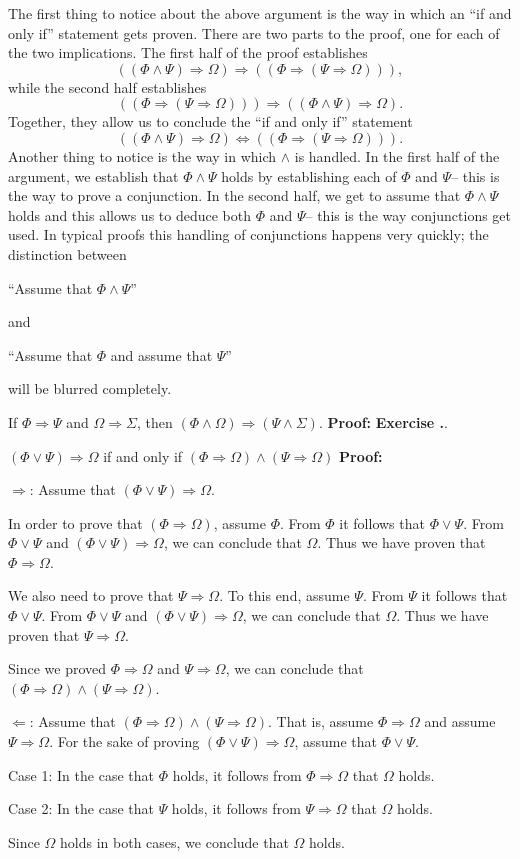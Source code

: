 \documentclass[12pt]{article}
\newcommand{\AND}{\wedge}
\newcommand{\OR}{\vee}
\newcommand{\ARR}{\Rightarrow}
\newcommand{\DARR}{\Leftrightarrow}
\newcounter{exercise}[subsubsection]
\newcounter{rule}
\def\putExerciseHeading{\refstepcounter{exercise} \textbf{Exercise \thesubsubsection.\theexercise}}
\def\putRuleNumber{\refstepcounter{rule}\therule}
\newcommand{\DRULEPF}[3]{\begin{tcolorbox}[title=Derived Rule \putRuleNumber: #1,colbacktitle=white,coltitle=black,colback=white] {#2} \tcblower \textbf{Proof:} {#3} \end{tcolorbox}}
\newcommand{\DRULEPZ}[2]{\begin{tcolorbox}[title=Derived Rule \putRuleNumber: #1,colbacktitle=white,coltitle=black,colback=white] {#2} \tcblower \textbf{Proof:} 
                         \putExerciseHeading. \end{tcolorbox}}
\def\pA{\Phi}
\def\pB{\Psi}
\def\pC{\Omega}
\def\pD{\Sigma}
\begin{document}
The first thing to notice about the above argument is the way in which an ``if and only if'' statement gets proven.
There are two parts to the proof, one for each of the two implications.
The first half of the proof establishes 
$$((\pA\AND\pB)\ARR\pC)\ARR((\pA\ARR(\pB\ARR\pC))),$$
while the second half establishes
$$((\pA\ARR(\pB\ARR\pC)))\ARR((\pA\AND\pB)\ARR\pC).$$
Together, they allow us to conclude the ``if and only if'' statement
$$((\pA\AND\pB)\ARR\pC)\DARR((\pA\ARR(\pB\ARR\pC))).$$
Another thing to notice is the way in which $\AND$ is handled.
In the first half of the argument, we establish that $\pA\AND\pB$ holds by establishing each of $\pA$ and $\pB$-- this is the way to prove a conjunction.
In the second half, we get to assume that $\pA\AND\pB$ holds and this allows us to deduce both $\pA$ and $\pB$-- this is the way conjunctions get used.
In typical proofs this handling of conjunctions happens very quickly; the distinction between
\begin{center} ``Assume that $\pA\AND\pB$''\end{center}
and
\begin{center} ``Assume that $\pA$ and assume that $\pB$''\end{center}
will be blurred completely.

\DRULEPZ{}{If $\pA\ARR\pB$ and $\pC\ARR\pD$, then $(\pA\AND\pC)\ARR(\pB\AND\pD)$.}

\DRULEPF{Disjunction and Implication}{
$(\pA\OR\pB)\ARR\pC$ if and only if $(\pA\ARR\pC)\AND(\pB\ARR\pC)$
}{
$\Rightarrow$:
Assume that $(\pA\OR\pB)\ARR\pC$.
\lsp

In order to prove that $(\pA\ARR\pC)$, assume $\pA$.
From $\pA$ it follows that $\pA\OR\pB$.
From $\pA\OR\pB$ and $(\pA\OR\pB)\ARR\pC$, we can conclude that $\pC$.
Thus we have proven that $\pA\ARR\pC$.
\lsp

We also need to prove that $\pB\ARR\pC$. To this end, assume $\pB$.
From $\pB$ it follows that $\pA\OR\pB$.
From $\pA\OR\pB$ and $(\pA\OR\pB)\ARR\pC$, we can conclude that $\pC$.
Thus we have proven that $\pB\ARR\pC$.
\lsp

Since we proved $\pA\ARR\pC$ and $\pB\ARR\pC$, we can conclude that $(\pA\ARR\pC)\AND(\pB\ARR\pC)$.
\lsp

$\Leftarrow$: 
Assume that $(\pA\ARR\pC)\AND(\pB\ARR\pC)$.
That is, assume  $\pA\ARR\pC$ and assume $\pB\ARR\pC$.
For the sake of proving $(\pA\OR\pB)\ARR\pC$, assume that $\pA\OR\pB$.
\lsp

Case 1: In the case that $\pA$ holds, it follows from $\pA\ARR\pC$ that $\pC$ holds.
\lsp

Case 2: In the case that $\pB$ holds, it follows from $\pB\ARR\pC$ that $\pC$ holds.
\lsp

Since $\pC$ holds in both cases, we conclude that $\pC$ holds.
}
\end{document}
